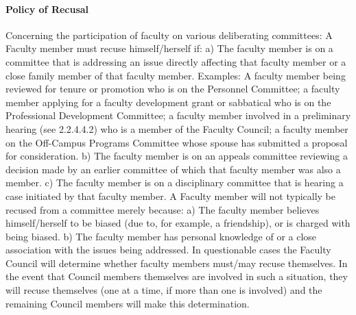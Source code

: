 \documentclass[letterpaper, 11pt]{article}
\begin{document}
			\paragraph{Policy of Recusal}
				Concerning the participation of faculty on various deliberating committees:  A Faculty member must recuse himself/herself if:
				a) The faculty member is on a committee that is addressing an issue directly affecting that faculty member or a close family member of that faculty member.  Examples: A faculty member being reviewed for tenure or promotion who is on the Personnel Committee; a faculty member applying for a faculty development grant or sabbatical who is on the Professional Development Committee; a faculty member involved in a preliminary hearing (see 2.2.4.4.2) who is a member of the Faculty Council; a faculty member on the Off-Campus Programs Committee whose spouse has submitted a proposal for consideration.
				b) The faculty member is on an appeals committee reviewing a decision made by an earlier committee of which that faculty member was also a member.
				c) The faculty member is on a disciplinary committee that is hearing a case initiated by that faculty member.
				A Faculty member will not typically be recused from a committee merely because:
				a) The faculty member believes himself/herself to be biased (due to, for example, a  friendship), or is charged with being biased.
				b) The faculty member has personal knowledge of or a close association with the issues being addressed.
				In questionable cases the Faculty Council will determine whether faculty members must/may recuse themselves.  In the event that Council members themselves are involved in such a situation, they will recuse themselves (one at a time, if more than one is involved) and the remaining Council members will make this determination.
\end{document}
